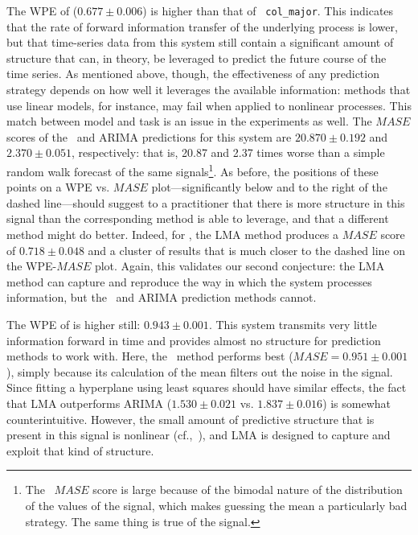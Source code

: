The WPE of \svdfive ($0.677 \pm 0.006$) is higher than that of {\tt
  col\_major}.  This indicates that the rate of forward information
transfer of the underlying process is lower, but that time-series data
from this system still contain a significant amount of structure that
can, in theory, be leveraged to predict the future course of the time
series.  As mentioned above, though, the effectiveness of any
prediction strategy depends on how well it leverages the available
information: methods that use linear models, for instance, may fail
when applied to nonlinear processes.
% 
% 
This match between model and task is an issue in the \svdfive
experiments as well.  The $MASE$ scores of the \naive ~and ARIMA
predictions for this system are $20.870 \pm 0.192$ and $2.370 \pm
0.051$, respectively: that is, 20.87 and 2.37 times worse than a
simple random walk forecast of the same signals\footnote{The \naive
  ~$MASE$ score is large because of the bimodal nature of the
  distribution of the values of the signal, which makes guessing the
  mean a particularly bad strategy.  The same thing is true of the
  \svdthree signal.}.  As before, the positions of these points on a
WPE vs. $MASE$ plot---significantly below and to the right of the
dashed line---should suggest to a practitioner that there is more
structure in this signal than the corresponding method is able to
leverage, and that a different method might do better.  Indeed, for
\svdfive, the LMA method produces a $MASE$ score of $ 0.718\pm 0.048 $
and a cluster of results that is much closer to the dashed line on the
WPE-$MASE$ plot.  Again, this validates our second conjecture: the LMA
method can capture and reproduce the way in which the \svdfive system
processes information, but the \naive ~and ARIMA prediction methods
cannot.

The WPE of \gcc is higher still: $0.943 \pm 0.001$.  This system
transmits very little information forward in time and provides almost
no structure for prediction methods to work with.  Here, the \naive
~method performs best ($MASE=0.951 \pm 0.001$), simply because its
calculation of the mean filters out the noise in the signal.  Since
fitting a hyperplane using least squares should have similar effects,
the fact that LMA outperforms ARIMA ($1.530 \pm 0.021$ vs. $1.837 \pm
0.016$) is somewhat counterintuitive.  However, the small amount of
predictive structure that is present in this signal is nonlinear
(cf.,~\cite{mytkowicz09}), and LMA is designed to capture and exploit
that kind of structure.

